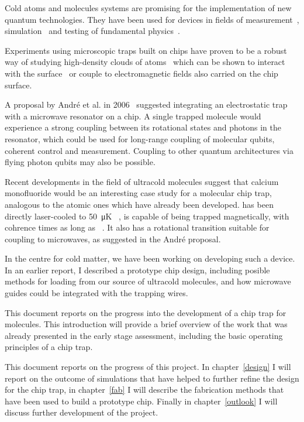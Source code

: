 Cold atoms and molecules systems are promising for the implementation of new
quantum technologies. They have been used for devices in fields of
measurement~\cite{PhysRevLett.120.103201}, simulation~\cite{Gross995} and
testing of fundamental physics~\cite{DeMille990}.

Experiments using microscopic traps built on chips have proven to be a robust
way of studying high-density clouds of atoms~\cite{Reichel1999, Ott2001} which
can be shown to interact with the surface~\cite{} or couple to electromagnetic
fields also carried on the chip surface.~\cite{Treutlein2008, Hinds??}

A proposal by Andr\'e et al. in 2006~\cite{Andre2006} suggested integrating an
electrostatic trap with a microwave resonator on a chip. A single trapped
molecule would experience a strong coupling between its rotational states and
photons in the resonator, which could be used for long-range coupling of
molecular qubits, coherent control and measurement. Coupling to other quantum
architectures via flying photon qubits may also be
possible.~\cite{PhysRevLett.92.063601}

Recent developments in the field of ultracold molecules suggest that calcium
monofluoride would be an interesting case study for a molecular chip trap,
analogous to the atomic ones which have already been developed. \CaF{} has been
directly laser-cooled to \SI{50}{\micro\kelvin} ~\cite{}, is capable of being
trapped magnetically, with cohrence times as long as ~\cite{}. It also
has a rotational transition suitable for coupling to microwaves, as suggested
in the Andr\'e proposal.

In the centre for cold matter, we have been working on developing such a
device. In an earlier report, I described a prototype chip design, including
posible methods for loading from our source of ultracold molecules, and how
microwave guides could be integrated with the trapping wires.

This document reports on the progress into the development of a chip trap for
\CaF{} molecules. This introduction will provide a brief overview of the work that
was already presented in the early stage assessment, including the basic
operating principles of a chip trap.

This document reports on the progress of this project.  In chapter~\ref{design}
I will report on the outcome of simulations that have helped to further refine
the design for the chip trap, in chapter~\ref{fab} I will describe the
fabrication methods that have been used to build a prototype chip. Finally in
chapter~\ref{outlook} I will discuss further development of the project.



